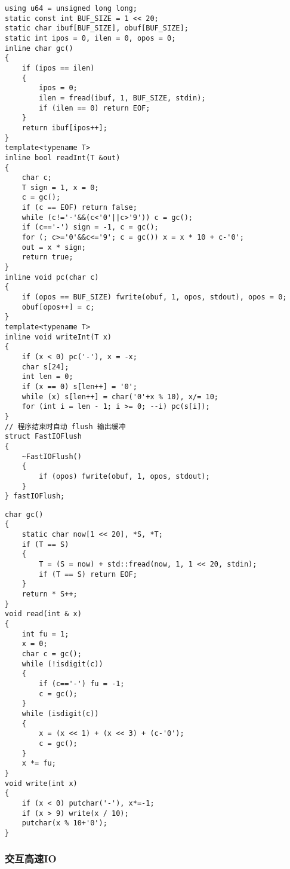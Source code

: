 \documentclass[a4paper,fontset=none]{ctexart}
\begin{document}
\begin{verbatim}
using u64 = unsigned long long;
static const int BUF_SIZE = 1 << 20;
static char ibuf[BUF_SIZE], obuf[BUF_SIZE];
static int ipos = 0, ilen = 0, opos = 0;
inline char gc()
{
    if (ipos == ilen)
    {
        ipos = 0;
        ilen = fread(ibuf, 1, BUF_SIZE, stdin);
        if (ilen == 0) return EOF;
    }
    return ibuf[ipos++];
}
template<typename T>
inline bool readInt(T &out)
{
    char c;
    T sign = 1, x = 0;
    c = gc();
    if (c == EOF) return false;
    while (c!='-'&&(c<'0'||c>'9')) c = gc();
    if (c=='-') sign = -1, c = gc();
    for (; c>='0'&&c<='9'; c = gc()) x = x * 10 + c-'0';
    out = x * sign;
    return true;
}
inline void pc(char c)
{
    if (opos == BUF_SIZE) fwrite(obuf, 1, opos, stdout), opos = 0;
    obuf[opos++] = c;
}
template<typename T>
inline void writeInt(T x)
{
    if (x < 0) pc('-'), x = -x;
    char s[24];
    int len = 0;
    if (x == 0) s[len++] = '0';
    while (x) s[len++] = char('0'+x % 10), x/= 10;
    for (int i = len - 1; i >= 0; --i) pc(s[i]);
}
// 程序结束时自动 flush 输出缓冲
struct FastIOFlush
{
    ~FastIOFlush()
    {
        if (opos) fwrite(obuf, 1, opos, stdout);
    }
} fastIOFlush;
\end{verbatim}

\begin{verbatim}
char gc()
{
    static char now[1 << 20], *S, *T;
    if (T == S)
    {
        T = (S = now) + std::fread(now, 1, 1 << 20, stdin);
        if (T == S) return EOF;
    }
    return * S++;
}
void read(int & x)
{
    int fu = 1;
    x = 0;
    char c = gc();
    while (!isdigit(c))
    {
        if (c=='-') fu = -1;
        c = gc();
    }
    while (isdigit(c))
    {
        x = (x << 1) + (x << 3) + (c-'0');
        c = gc();
    }
    x *= fu;
}
void write(int x)
{
    if (x < 0) putchar('-'), x*=-1;
    if (x > 9) write(x / 10);
    putchar(x % 10+'0');
}
\end{verbatim}
\subsubsection{交互高速IO}
\end{document}
